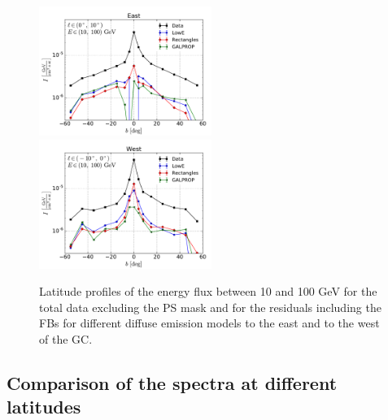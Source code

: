 \begin{figure}[h]
\includegraphics[width=0.5\textwidth]{plots/Profiles_l=1_source_range_1.pdf}
\includegraphics[width=0.5\textwidth]{plots/Profiles_l=0_source_range_1.pdf}
  	\caption{Latitude profiles of the energy flux between 10 and 100 GeV for the total data excluding the PS mask and for 
	the residuals including the FBs for 
	different diffuse emission models to the east and to the west of the GC.}
  	\label{fig:Profiles}
\end{figure}

\subsection{Comparison of the spectra at different latitudes}

